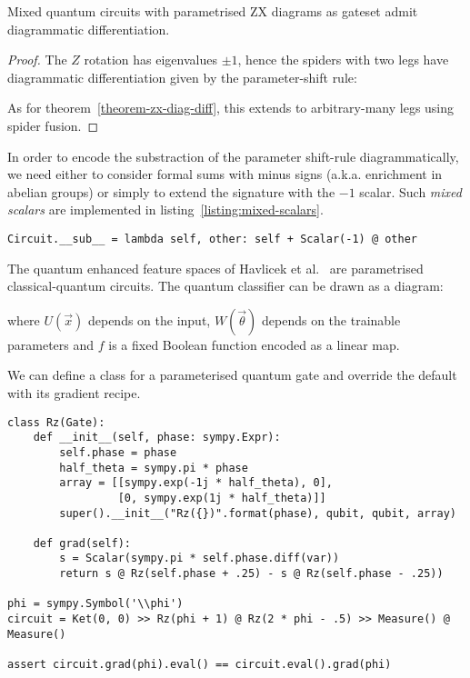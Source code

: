 \begin{corollary}
Mixed quantum circuits with parametrised ZX diagrams as gateset admit diagrammatic differentiation.
\end{corollary}

\begin{proof}
The $Z$ rotation has eigenvalues $\pm 1$, hence the spiders with two legs have
diagrammatic differentiation given by the parameter-shift rule:


As for theorem~\ref{theorem-zx-diag-diff}, this extends to
arbitrary-many legs using spider fusion.
\end{proof}

\begin{remark}
In order to encode the substraction of the parameter shift-rule diagrammatically, we
need either to consider formal sums with minus signs (a.k.a. enrichment in
abelian groups) or simply to extend the signature with the $-1$ scalar.
Such \emph{mixed scalars} are implemented in listing~\ref{listing:mixed-scalars}.

\begin{verbatim}
Circuit.__sub__ = lambda self, other: self + Scalar(-1) @ other
\end{verbatim}
\end{remark}

\begin{example}
The quantum enhanced feature spaces of Havlicek et al.~\cite{HavlicekEtAl19} are parametrised
classical-quantum circuits.
The quantum classifier can be drawn as a diagram:


where $U(\vec{x})$ depends on the input, $W(\vec{\theta})$ depends on the
trainable parameters and $f$ is a fixed Boolean function encoded as a linear map.
\end{example}

\begin{example}
We can define a class for a parameterised quantum gate and override the default  with its gradient recipe.

\begin{verbatim}
class Rz(Gate):
    def __init__(self, phase: sympy.Expr):
        self.phase = phase
        half_theta = sympy.pi * phase
        array = [[sympy.exp(-1j * half_theta), 0],
                 [0, sympy.exp(1j * half_theta)]]
        super().__init__("Rz({})".format(phase), qubit, qubit, array)

    def grad(self):
        s = Scalar(sympy.pi * self.phase.diff(var))
        return s @ Rz(self.phase + .25) - s @ Rz(self.phase - .25))

phi = sympy.Symbol('\\phi')
circuit = Ket(0, 0) >> Rz(phi + 1) @ Rz(2 * phi - .5) >> Measure() @ Measure()

assert circuit.grad(phi).eval() == circuit.eval().grad(phi)
\end{verbatim}
\end{example}
